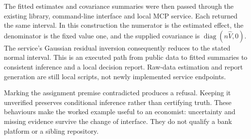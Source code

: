 The fitted estimates and covariance summaries were then passed through the
existing library, command-line interface and local MCP service. Each returned
the same interval. In this construction the numerator is the estimated effect,
the denominator is the fixed value one, and the supplied covariance is
$\operatorname{diag}(n\widehat V,0)$. The service's Gaussian residual
inversion consequently reduces to the stated normal interval. This is an
executed path from public data to fitted summaries to consistent inference
and a local decision report. Raw-data estimation and report generation are
still local scripts, not newly implemented service endpoints.

Marking the assignment premise contradicted produces a refusal. Keeping it
unverified preserves conditional inference rather than certifying truth.
These behaviours make the worked example useful to an economist: uncertainty
and missing evidence survive the change of interface. They do not qualify a
bank platform or a sibling repository.
